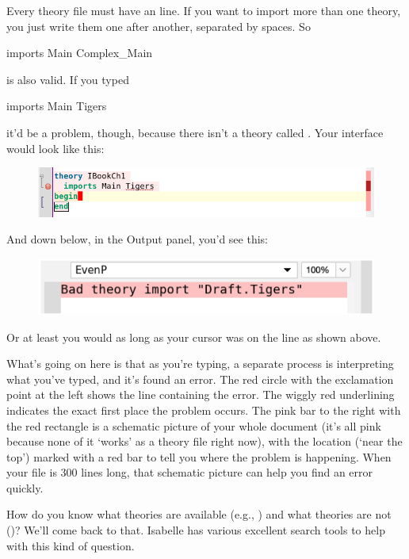 Every theory file must have an  line. If you want to import more than one theory, you just write them one after another, separated by spaces. So 
\begin{IS}    
imports Main Complex_Main
\end{IS}
\noindent
is also valid. If you typed
\begin{IS}    
imports Main Tigers
\end{IS}    
\noindent
it'd be a problem, though, because there isn't a theory called . Your interface would look like this:
\begin{figure}[h]
    \centering
    \includegraphics[width=1\linewidth]{TEXT/C01/Images/tigers.png}
\end{figure}
\newpage
And down below, in the Output panel, you'd see this:
\begin{figure}[h]
    \centering
    \includegraphics[width=0.75\linewidth]{TEXT/C01/Images/tiger-error.png}
\end{figure}

Or at least you would as long as your cursor was on the  line as shown above. 

What's going on here is that as you're typing, a separate process is interpreting what you've typed, and it's found an error. The red circle with the exclamation point at the left shows the line containing the error. The wiggly red underlining indicates the exact first place the problem occurs. The pink bar to the right with the red rectangle is a schematic picture of your whole document (it's all pink because none of it `works' as a theory file right now), with the location (`near the top') marked with a red bar to tell you where the problem is happening. When your file is 300 lines long, that schematic picture can help you find an error quickly. 

How do you know what theories are available (e.g., ) and what theories are not ()? We'll come back to that. Isabelle has various excellent search tools to help with this kind of question. 

